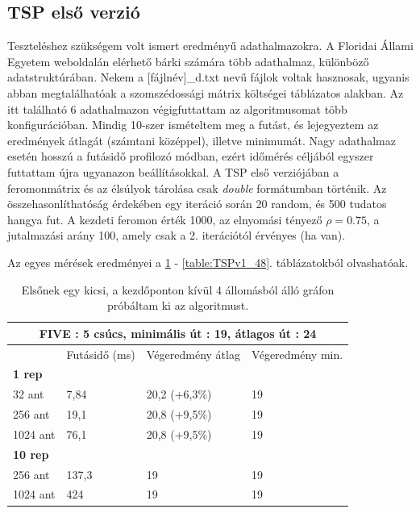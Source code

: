 \subsection{TSP első verzió}

Teszteléshez szükségem volt ismert eredményű adathalmazokra. A Floridai Állami Egyetem weboldalán \cite{TSPdataset} elérhető bárki számára több adathalmaz, különböző adatstruktúrában. Nekem a [fájlnév]\_d.txt nevű fájlok voltak hasznosak, ugyanis abban megtalálhatóak a szomszédossági mátrix költségei táblázatos alakban. Az itt található 6 adathalmazon végigfuttattam az algoritmusomat több konfigurációban. Mindig 10-szer ismételtem meg a futást, és lejegyeztem az eredmények átlagát (számtani középpel), illetve minimumát. Nagy adathalmaz esetén hosszú a futásidő profilozó módban, ezért időmérés céljából egyszer futtattam újra ugyanazon beállításokkal. A TSP első verziójában a feromonmátrix és az élsúlyok tárolása csak \textit{double} formátumban történik. Az összehasonlíthatóság érdekében egy iteráció során 20 random, és 500 tudatos hangya fut. A kezdeti feromon érték 1000, az elnyomási tényező \( \rho = 0.75 \), a jutalmazási arány 100, amely csak a 2. iterációtól érvényes (ha van). 

Az egyes mérések eredményei a \ref{table:TSPv1_5} - \ref{table:TSPv1_48}. táblázatokból olvashatóak.

\begin{table}[ht!]
	\centering
	\begin{tabular}{|p{2cm}||p{3cm}|p{3.5cm}|p{3.5cm}|}
		\hline
		\multicolumn{4}{|c|}{FIVE : 5 csúcs, minimális út : 19, átlagos út : 24} \\
		\hline
		& Futásidő (ms) & Végeredmény átlag & Végeredmény min.\\
		\hline
		\textbf{1 rep} & & &\\
		32 ant& 7,84 & 20,2 (+6,3\%) & 19\\
		256 ant & 19,1 & 20,8 (+9,5\%) & 19\\
		1024 ant & 76,1 & 20,8 (+9,5\%) &	19\\
		\hline
		\textbf{10 rep} & & &\\
		256 ant & 137,3 & 19 &	19\\
		1024 ant & 424 &	19 &	19\\
		\hline
	\end{tabular}
	\caption{Elsőnek egy kicsi, a kezdőponton kívül 4 állomásból álló gráfon próbáltam ki az algoritmust.}
	\label{table:TSPv1_5}
\end{table}

